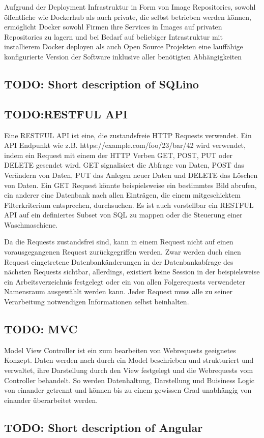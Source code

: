 Aufgrund der Deployment Infrastruktur in Form von Image Repositories, sowohl
öffentliche wie Dockerhub als auch private, die selbst betrieben werden können,
ermöglicht Docker sowohl Firmen ihre Services in Images auf privaten
Repositories zu lagern und bei Bedarf auf beliebiger Intrastruktur mit
installierem Docker deployen als auch Open Source Projekten eine lauffähige
konfigurierte Version der Software inklusive aller benötigten Abhängigkeiten 

\subsection{TODO: Short description of SQLino}

\subsection{TODO:RESTFUL API} Eine RESTFUL API ist eine, die
zustandsfreie HTTP Requests verwendet. Ein API
Endpunkt wie
z.B. https://example.com/foo/23/bar/42 wird verwendet, indem ein
Request mit einem der HTTP Verben GET, POST, PUT oder DELETE gesendet
wird.  GET signalisiert die Abfrage von Daten, POST das Verändern von
Daten, PUT das Anlegen neuer Daten und DELETE das Löschen von
Daten. Ein GET Request könnte beispielsweise ein bestimmtes Bild
abrufen, ein anderer eine Datenbank nach allen Einträgen, die einem
mitgeschicktem Filterkriterium entsprechen, durchsuchen. Es ist auch
vorstellbar ein RESTFUL API auf ein definiertes Subset von SQL zu
mappen oder die Steuerung einer Waschmaschiene.

Da die Requests zustandsfrei sind, kann in einem Request nicht auf
einen vorausgegangenen Request zurückgegriffen werden. Zwar werden
duch einen Request eingetretene Datenbankänderungen in der
Datenbankabfrage des nächsten Requests sichtbar, allerdings, existiert
keine Session in der beispielsweise ein Arbeitsverzeichnis festgelegt
oder ein von allen Folgerequests verwendeter Namensraum ausgewählt
werden kann. Jeder Request muss alle zu seiner Verarbeitung
notwendigen Informationen selbst beinhalten.

\subsection{TODO: MVC} Model View Controller ist ein zum bearbeiten
von Webrequests geeignetes Konzept.  Daten werden nach durch ein Model
beschrieben und strukturiert und verwaltet, ihre Darstellung durch den
View festgelegt und die Webrequests vom Controller behandelt. So
werden Datenhaltung, Darstellung und Buisiness Logic von einander
getrennt und können bis zu einem gewissen Grad unabhängig von einander
überarbeitet werden.

\subsection{TODO: Short description of Angular}


